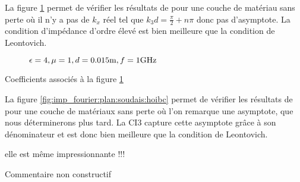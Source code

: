       La figure \ref{fig:imp_fourier:plan:hoppe:33:hoibc} permet de vérifier les résultats de \cite[p.~33]{hoppe_impedance_1995} pour une couche de matériau sans perte où il n'y a pas de \(k_x\) réel tel que \(k_3d=\frac{\pi}{2} + n \pi\) donc pas d'asymptote.
      La condition d'impédance d'ordre élevé est bien meilleure que la condition de Leontovich.
      \begin{figure}[!hbt]
        \centering
        
        \caption[Partie imaginaire de l'opérateur de Calderón, comparé avec les approximations CI0, CI3 pour une couche plane de matériau de Hoppe \& Rahmat-Samii, avec ondes évanescentes]{\(\epsilon = 4, \mu = 1, d=0.015\text{m}, f=1\text{GHz}\)}
        \label{fig:imp_fourier:plan:hoppe:33:hoibc}
      \end{figure}
      \begin{table}[!hbt]
        \centering
        \caption{Coefficients associés à la figure \ref{fig:imp_fourier:plan:hoppe:33:hoibc}}
        \label{tab:imp_fourier:plan:hoppe:33:hoibc}
      \end{table}

      \FloatBarrier

      La figure \ref{fig:imp_fourier:plan:soudais:hoibc} permet de vérifier les résultats de \cite[p.~11]{soudais_3d_2017} pour une couche de matériaux sans perte où l'on remarque une asymptote, que nous déterminerons plus tard.
      La CI3 capture cette asymptote grâce à son dénominateur et est donc bien meilleure que la condition de Leontovich.

\begin{REM}
  elle est même impressionnante !!!
\end{REM}
\begin{REP}
  Commentaire non constructif
\end{REP}

